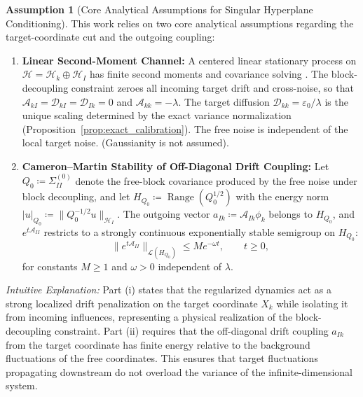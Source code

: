 \documentclass[11pt]{amsart}
\theoremstyle{plain}
\theoremstyle{definition}
\newtheorem{assumption}[theorem]{Assumption}
\theoremstyle{remark}
\begin{document}
\begin{assumption}[Core Analytical Assumptions for Singular Hyperplane Conditioning]
  This work relies on two core analytical assumptions regarding the target-coordinate cut and the outgoing coupling:
  \begin{enumerate}
    \item[(i)] \textbf{Linear Second-Moment Channel:} \label{assum:linear_second_moment} A centered linear stationary process on $\mathcal{H}=\mathcal{H}_k\oplus \mathcal{H}_I$ has finite second moments and covariance solving . The block-decoupling constraint zeroes all incoming target drift and cross-noise, so that $\mathcal{A}_{kI}=\mathcal{D}_{kI}=\mathcal{D}_{Ik}=0$ and $\mathcal{A}_{kk}=-\lambda$. The target diffusion $\mathcal{D}_{kk}=\varepsilon_0/\lambda$ is the unique scaling determined by the exact variance normalization (Proposition~\ref{prop:exact_calibration}). The free noise is independent of the local target noise. (Gaussianity is not assumed).
    \item[(ii)] \textbf{Cameron--Martin Stability of Off-Diagonal Drift Coupling:} \label{assum:cm_stability} Let $Q_0\coloneqq\Sigma_{II}^{(0)}$ denote the free-block covariance produced by the free noise under block decoupling, and let $H_{Q_0}\coloneqq\operatorname{Range}(Q_0^{1/2})$ with the energy norm $|u|_{Q_0}\coloneqq\|Q_0^{-1/2}u\|_{\mathcal{H}_I}$. The outgoing vector $a_{Ik}\coloneqq\mathcal{A}_{Ik}\phi_k$ belongs to $H_{Q_0}$, and $e^{t\mathcal{A}_{II}}$ restricts to a strongly continuous exponentially stable semigroup on $H_{Q_0}$:
    \begin{equation}
      \|e^{t\mathcal{A}_{II}}\|_{\mathcal{L}(H_{Q_0})} \le M e^{-\omega t},\qquad t\ge0,
    \end{equation}
    for constants $M\ge1$ and $\omega>0$ independent of $\lambda$.
  \end{enumerate}
  \vspace{1mm}
  \noindent\textit{Intuitive Explanation:} Part (i) states that the regularized dynamics act as a strong localized drift penalization on the target coordinate $X_k$ while isolating it from incoming influences, representing a physical realization of the block-decoupling constraint. Part (ii) requires that the off-diagonal drift coupling $a_{Ik}$ from the target coordinate has finite energy relative to the background fluctuations of the free coordinates. This ensures that target fluctuations propagating downstream do not overload the variance of the infinite-dimensional system.
\end{assumption}
\end{document}
